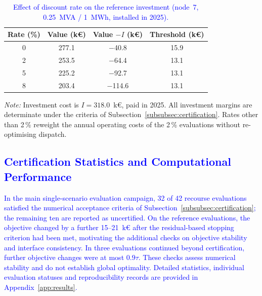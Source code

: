 \documentclass[preprint,12pt]{elsarticle}
\begin{document}
\begin{table}[htbp!]
    \centering
    \caption{\textcolor{blue}{Effect of discount rate on the reference investment (node~7, 0.25~MVA / 1~MWh, installed in 2025).}}
    \label{tab:res_discount}
    \footnotesize\setlength{\tabcolsep}{5pt}
    \begin{tabular}{c c c c}
        \toprule
        Rate (\%) & Value (k\euro) & Value $- I$ (k\euro) & Threshold (k\euro) \\
        \midrule
        0 & 277.1 & $-$40.8  & 15.9 \\
        2 & 253.5 & $-$64.4  & 13.1 \\
        5 & 225.2 & $-$92.7  & 13.1 \\
        8 & 203.4 & $-$114.6 & 13.1 \\
        \bottomrule
    \end{tabular}
    \par\smallskip
    \begin{minipage}{\linewidth}
        \footnotesize\raggedright
        \textit{Note:}
        Investment cost is $I=318.0$~k\euro{}, paid in 2025.
        All investment margins are determinate under the criteria of Subsection~\ref{subsubsec:certification}.
        Rates other than 2\,\% reweight the annual operating costs of the 2\,\% evaluations without re-optimising dispatch.
    \end{minipage}
\end{table}

\subsection{\textcolor{blue}{Certification Statistics and Computational Performance}}
\label{subsec:res_certification}

\textcolor{blue}{
    In the main single-scenario evaluation campaign, 32 of 42 recourse evaluations satisfied the numerical acceptance criteria of Subsection~\ref{subsubsec:certification}; the remaining ten are reported as uncertified. On the reference evaluations, the objective changed by a further 15--21~k\euro{} after the residual-based stopping criterion had been met, motivating the additional checks on objective stability and interface consistency. In three evaluations continued beyond certification, further objective changes were at most $0.9\tau$. These checks assess numerical stability and do not establish global optimality. Detailed statistics, individual evaluation statuses and reproducibility records are provided in Appendix~\ref{app:results}.
}
\end{document}
